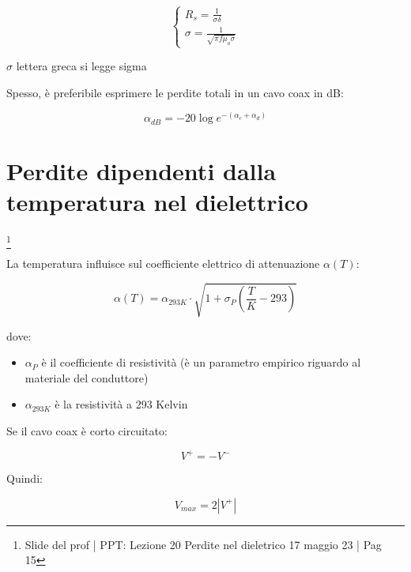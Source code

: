 {\Large \begin{equation}
    \begin{cases}
        R_s = \frac{1}{\sigma \delta} \\ 
        \sigma = \frac{1}{\sqrt{\pi f \mu_o \sigma}}
    \end{cases}
\end{equation}}

\begin{tcolorbox}
    $\sigma$ lettera greca si legge sigma
\end{tcolorbox}

Spesso, è preferibile esprimere le perdite totali in un cavo coax in dB: 

{\Large \begin{equation}
    \alpha_{dB} = -20 \log e^{- (\alpha_c + \alpha_d)}
\end{equation}} 

\newpage 

\section{Perdite dipendenti dalla temperatura nel dielettrico}

\footnote{Slide del prof | PPT: Lezione 20 Perdite nel dieletrico 17 maggio 23 | Pag 15}

La temperatura influisce sul coefficiente elettrico di attenuazione $\alpha(T)$: 

{\Large \begin{equation}
    \alpha (T) = \alpha_{293 K} \cdot \sqrt{1 + \sigma_P (\frac{T}{K} - 293)}
\end{equation}}


dove: 
\begin{itemize}
    \item $\alpha_P$ è il coefficiente di resistività (è un parametro empirico riguardo al materiale del conduttore) 
    \item $\alpha_{293 K}$  è la resistività a 293 Kelvin 
\end{itemize}

Se il cavo coax è corto circuitato: 

{\Large \begin{equation}
    V^{+} = -V^{-}
\end{equation}} 

Quindi: 

{\Large \begin{equation}
    V_{max} = 2 \left|V^{+}\right|
\end{equation}}

\newpage 

